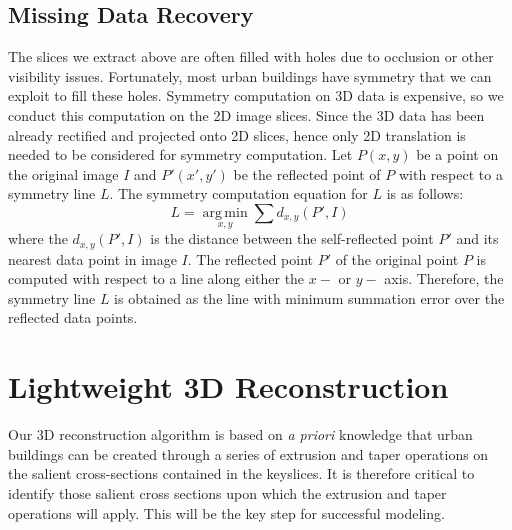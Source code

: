 \documentclass{llncs}
\begin{document}
\subsection{Missing Data Recovery}
\label{sec_mdr}
The slices we extract above are often filled with holes due to occlusion
or other visibility issues.
Fortunately, most urban buildings have symmetry that we can exploit to
fill these holes.
Symmetry computation on 3D data \cite{Sym_PSGRF,Sym_ZPA} is expensive,
so we conduct this computation on the 2D image slices.
Since the 3D data has been already rectified \cite{RDP_LSYGS} and projected onto 2D slices, hence only 2D translation
is needed to be considered for symmetry computation.
Let $P(x,y)$ be a point on the original image $I$ and $P'(x',y')$ be the reflected
point of $P$ with respect to a symmetry line $L$.
The symmetry computation equation for $L$ is as follows:
\begin{equation}
L = \underset{x,y}{\operatorname{arg\,min}}\sum{d_{x,y}(P', I)}
\end{equation}
where the $d_{x,y}(P',I)$ is the distance between the self-reflected point
$P'$ and its nearest data point in image $I$.
The reflected point $P'$ of the original point $P$ is computed with
respect to a line along either the $x-$ or $y-$ axis.
Therefore, the symmetry line $L$ is obtained as the line with minimum
summation error over the reflected data points.

\section{Lightweight 3D Reconstruction}
\label{sec_reconst}
Our 3D reconstruction algorithm is based on \emph{a priori} knowledge that
urban buildings can be created through a series of extrusion and taper
operations on the salient cross-sections contained in the keyslices.
It is therefore critical to identify those salient cross sections upon
which the extrusion and taper operations will apply.
This will be the key step for successful modeling.
\end{document}
